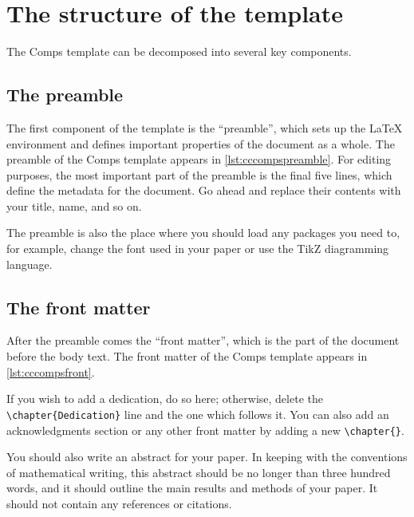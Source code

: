 \documentclass[twoside]{memoir}
\newcommand{\code}[1]{\texttt{#1}}
\begin{document}
\section{The structure of the template}
\label{s:structure}
The Comps template can be decomposed into several key components.

\subsection{The preamble}
\label{s:preamble}
The first component of the template is the \enquote{preamble}, which sets up the \LaTeX{} environment and defines important properties of the document as a whole.
The preamble of the Comps template appears in \cref{lst:cccompspreamble}.
For editing purposes, the most important part of the preamble is the final five lines, which define the metadata for the document.
Go ahead and replace their contents with your title, name, and so on.



The preamble is also the place where you should load any packages you need to, for example, change the font used in your paper or use the TikZ diagramming language.

\subsection{The front matter}
\label{s:frontmatter}
After the preamble comes the \enquote{front matter}, which is the part of the document before the body text.
The front matter of the Comps template appears in \cref{lst:cccompsfront}.



If you wish to add a dedication, do so here; otherwise, delete the \code{\textbackslash{}chapter\{Dedication\}} line and the one which follows it.
You can also add an acknowledgments section or any other front matter by adding a new \code{\textbackslash{}chapter\{\}}.

You should also write an abstract for your paper.
In keeping with the conventions of mathematical writing, this abstract should be no longer than three hundred words, and it should outline the main results and methods of your paper.
It should not contain any references or citations.
\end{document}
